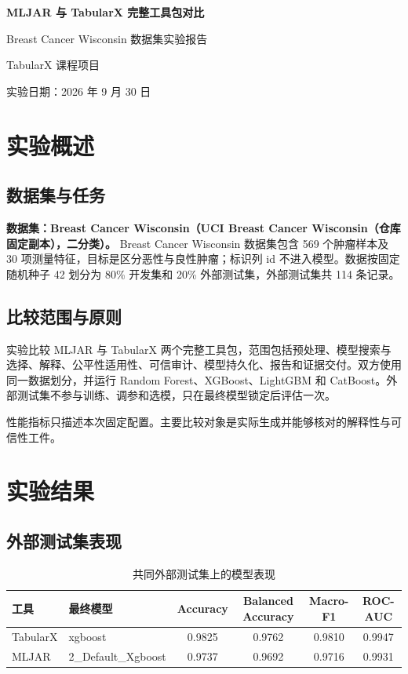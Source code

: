 \documentclass[degree=bachelor,language=chinese,fontset=fandol]{thuthesis}
\begin{document}
\begin{titlepage}
  \centering
  \vspace*{2.3cm}
  {\bfseries MLJAR 与 TabularX 完整工具包对比\par}
  \vspace{1.2cm}
  {Breast Cancer Wisconsin 数据集实验报告\par}
  \vspace{2.2cm}
  {TabularX 课程项目\par}
  \vfill
  {实验日期：2026 年 9 月 30 日\par}
  \vspace{1.2cm}
\end{titlepage}

\frontmatter
\tableofcontents
\mainmatter
\chapter{实验概述}
\section{数据集与任务}
\textbf{数据集：Breast Cancer Wisconsin（UCI Breast Cancer Wisconsin（仓库固定副本），二分类）。}
Breast Cancer Wisconsin 数据集包含 569 个肿瘤样本及 30 项测量特征，目标是区分恶性与良性肿瘤；标识列 id 不进入模型。数据按固定随机种子 42 划分为 80\% 开发集和 20\% 外部测试集，外部测试集共 114 条记录。

\section{比较范围与原则}
实验比较 MLJAR 与 TabularX 两个完整工具包，范围包括预处理、模型搜索与选择、解释、公平性适用性、可信审计、模型持久化、报告和证据交付。双方使用同一数据划分，并运行 Random Forest、XGBoost、LightGBM 和 CatBoost。外部测试集不参与训练、调参和选模，只在最终模型锁定后评估一次。

性能指标只描述本次固定配置。主要比较对象是实际生成并能够核对的解释性与可信性工件。

\chapter{实验结果}
\section{外部测试集表现}
\begin{table}[htbp]
  \centering
  \small
  \caption{共同外部测试集上的模型表现}
  \begin{tabular}{llcccc}
    \toprule
    工具 & 最终模型 & Accuracy & Balanced Accuracy & Macro-F1 & ROC-AUC \\
    \midrule
    TabularX & xgboost & 0.9825 & 0.9762 & 0.9810 & 0.9947 \\
    MLJAR & 2\_Default\_Xgboost & 0.9737 & 0.9692 & 0.9716 & 0.9931 \\
    \bottomrule
  \end{tabular}
\end{table}
\end{document}
